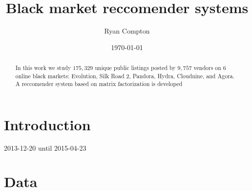 \documentclass[11pt]{amsart}
\title{Black market reccomender systems}
\author{Ryan Compton}
\date{\today}
\theoremstyle{remark}
\begin{document}
\begin{abstract}

In this work we study $175,329$ unique public listings posted by $9,757$ vendors on $6$ online black markets: Evolution, Silk Road 2, Pandora, Hydra, Cloudnine, and Agora. A reccomender system based on matrix factorization is developed

\end{abstract}

\maketitle

\section{Introduction}
\label{sec:introduction}

2013-12-20 until 2015-04-23

\section{Data}
\label{sec:data}
\end{document}
